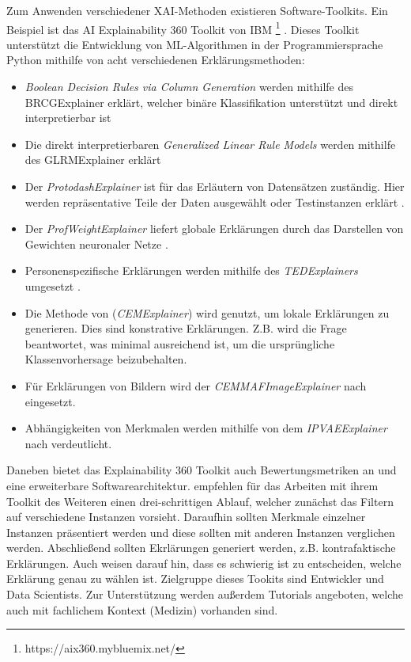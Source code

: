 Zum Anwenden verschiedener XAI-Methoden existieren Software-Toolkits. Ein Beispiel ist das AI Explainability 360 Toolkit von IBM \footnote{https://aix360.mybluemix.net/} \cite{arya2021ai}. Dieses Toolkit unterstützt die Entwicklung von ML-Algorithmen in der Programmiersprache Python mithilfe von acht verschiedenen Erklärungsmethoden:
\begin{itemize}
    \item \emph{Boolean Decision Rules via Column Generation} werden mithilfe des BRCGExplainer erklärt, welcher binäre Klassifikation unterstützt und direkt interpretierbar ist \cite{dash2018boolean}
    \item Die direkt interpretierbaren \emph{Generalized Linear Rule Models} werden mithilfe des GLRMExplainer erklärt \cite{wei2019generalized}
    \item Der \emph{ProtodashExplainer} ist für das Erläutern von Datensätzen zuständig. Hier werden repräsentative Teile der Daten ausgewählt oder Testinstanzen erklärt \cite{gurumoorthy2019efficient}.
    \item Der \emph{ProfWeightExplainer} liefert globale Erklärungen durch das Darstellen von Gewichten neuronaler Netze \cite{dhurandhar2018improving}.
    \item Personenspezifische Erklärungen werden mithilfe des \emph{TEDExplainers} umgesetzt \cite{hind2019ted}.
    \item Die Methode von \cite{dhurandhar2018explanations} (\emph{CEMExplainer}) wird genutzt, um lokale Erklärungen zu generieren. Dies sind konstrative Erklärungen. Z.B. wird die Frage beantwortet, was minimal ausreichend ist, um die ursprüngliche Klassenvorhersage beizubehalten.
    \item Für Erklärungen von Bildern wird der \emph{CEMMAFImageExplainer} nach \cite{luss2019generating} eingesetzt.
    \item Abhängigkeiten von Merkmalen werden mithilfe von dem \emph{IPVAEExplainer} nach \cite{kumar2017variational} verdeutlicht.
\end{itemize}
Daneben bietet das Explainability 360 Toolkit auch Bewertungsmetriken an und eine erweiterbare Softwarearchitektur. \cite{arya2021ai} empfehlen für das Arbeiten mit ihrem Toolkit des Weiteren einen drei-schrittigen Ablauf, welcher zunächst das Filtern auf verschiedene Instanzen vorsieht. Daraufhin sollten Merkmale einzelner Instanzen präsentiert werden und diese sollten mit anderen Instanzen verglichen werden. Abschließend sollten Ekrlärungen generiert werden, z.B. kontrafaktische Erklärungen. Auch \cite{arya2021ai} weisen darauf hin, dass es schwierig ist zu entscheiden, welche Erklärung genau zu wählen ist. Zielgruppe dieses Tookits sind Entwickler und Data Scientists. Zur Unterstützung werden außerdem Tutorials angeboten, welche auch mit fachlichem Kontext (Medizin) vorhanden sind.

